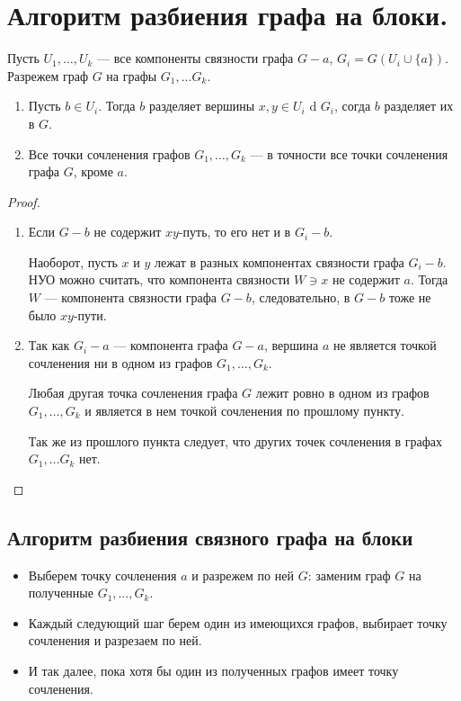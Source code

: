 \section{Алгоритм разбиения графа на блоки.}
Пусть $U_1, \ldots , U_k$ --- все  компоненты связности графа $G-a$, $G_i = G(U_i \cup \{a\})$. Разрежем граф  $G$ на графы $G_1, \ldots G_k$.

\begin{lemma}\label{lm:connectivity_4}
	\begin{enumerate}
		\item Пусть $b \in U_i$. Тогда $b$ разделяет вершины $x, y \in  U_i$ d $G_i$, согда $b$ разделяет их в $G$.
		\item Все точки сочленения графов $G_1, \ldots , G_k$ --- в точности все точки сочленения графа $G$, кроме $a$.
	\end{enumerate}
\end{lemma}
\begin{proof}
    \begin{enumerate}
		\item Если $G-b$ не содержит $xy$-путь, то его нет и в $G_i - b$.
		
			Наоборот, пусть $x$ и $y$ лежат в разных компонентах связности графа $G_i -b$. НУО можно считать, что компонента связности $W \ni x$ не содержит $a$. Тогда $W$ --- компонента связности графа $G-b$, следовательно, в $G-b$ тоже не было $xy$-пути.
		\item Так как $G_i - a$ --- компонента графа $G-a$, вершина $a$ не является точкой сочленения ни в одном  из графов $G_1, \ldots , G_k$.

			Любая другая точка сочленения графа $G$ лежит ровно в одном из графов $G_1, \ldots , G_k $ и является в нем точкой сочленения по прошлому пункту.

			Так же из прошлого пункта следует, что других точек сочленения в графах $G_1, \ldots G_k $ нет.
    \end{enumerate}
\end{proof}
\subsection{Алгоритм разбиения связного графа на блоки}
\begin{itemize}
	\item Выберем точку сочленения $a$ и разрежем по ней $G$: заменим граф $G$ на полученные $G_1, \ldots , G_k$.
	\item Каждый следующий шаг берем один из имеющихся графов, выбирает точку сочленения и разрезаем по ней.
	\item И так далее, пока хотя бы один из полученных графов имеет точку сочленения.
\end{itemize}

